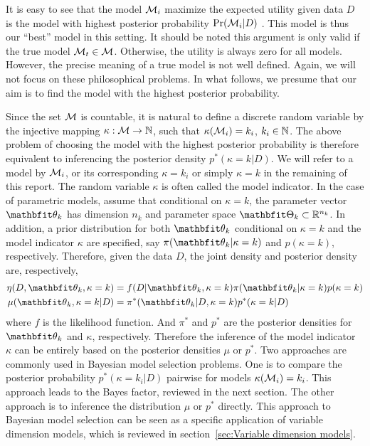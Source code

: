 It is easy to see that the model $\mathcal{M}_i$ maximize the expected utility given
data $D$ is the model with highest posterior probability $\Pr(\mathcal{M}_i|D)$
\parencite[see][chap.~6]{Bernardo2000}. This model is thus our ``best'' model
in this setting. It should be noted this argument is only valid if the true
model $\mathcal{M}_t \in \mathcal{M}$. Otherwise, the utility is always zero for all
models. However, the precise meaning of a true model is not well defined.
Again, we will not focus on these philosophical problems. In what follows, we
presume that our aim is to find the model with the highest posterior
probability.

Since the set $\mathcal{M}$ is countable, it is natural to define a discrete random
variable by the injective mapping $\kappa:\mathcal{M}\to\mathbb{N}$, such that
$\kappa(\mathcal{M}_i) = k_i$, $k_i \in \mathbb{N}$. The above problem of choosing the
model with the highest posterior probability is therefore equivalent to
inferencing the posterior density $p^*(\kappa = k|D)$. We will refer to a
model by $\mathcal{M}_i$, or its corresponding $\kappa = k_i$ or simply $\kappa = k$
in the remaining of this report. The random variable $\kappa$ is often called
the model indicator. In the case of parametric models, assume that conditional
on $\kappa = k$, the parameter vector $\bth_k$ has dimension $n_k$ and
parameter space $\bTh_k\subset\bbR^{n_k}$. In addition, a prior distribution
for both $\bth_k$ conditional on $\kappa = k$ and the model indicator $\kappa$
are specified, say $\pi(\bth_k|\kappa =k)$ and $p(\kappa = k)$, respectively.
Therefore, given the data $D$, the joint density and posterior density are,
respectively,
\begin{align}
  \eta(D,\bth_k,\kappa=k)
  &= f(D|\bth_k,\kappa=k)\pi(\bth_k|\kappa=k)p(\kappa=k)
  \label{eq:full joint}\\
  \mu(\bth_k,\kappa=k|D)
  &= \pi^*(\bth_k|D,\kappa=k)p^*(\kappa=k|D)
  \label{eq:full posterior}
\end{align}
where $f$ is the likelihood function. And $\pi^*$ and $p^*$ are the posterior
densities for $\bth_k$ and $\kappa$, respectively. Therefore the inference of
the model indicator $\kappa$ can be entirely based on the posterior densities
$\mu$ or $p^*$. Two approaches are commonly used in Bayesian model selection
problems. One is to compare the posterior probability $p^*(\kappa=k_i|D)$
pairwise for models $\kappa(\mathcal{M}_i) = k_i$. This approach leads to the Bayes
factor, reviewed in the next section. The other approach is to inference the
distribution $\mu$ or $p^*$ directly. This approach to Bayesian model
selection can be seen as a specific application of variable dimension models,
which is reviewed in section~\ref{sec:Variable dimension models}.

